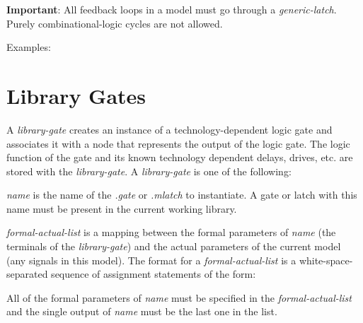 {\begin{pespace}
{\bf Important}: All feedback loops in a model must go through a {\em
generic-latch}.  Purely combinational-logic cycles are not allowed.

Examples:

\section{Library Gates}

A {\em library-gate} creates an instance of a technology-dependent logic gate
and associates it with a node that represents the output of
the logic gate.  The logic function of the
gate and its known technology dependent delays, drives, etc. are stored with
the {\em library-gate}.  A {\em library-gate} is one of the following:


\begin{description}
\item {\em name} is the name of the {\em .gate} or {\em .mlatch} to
instantiate.  A gate or latch with this name must be present in the current
working library.

\item {\em formal-actual-list} is a mapping between the formal parameters of
{\em name} (the terminals of the {\em library-gate}) and the actual
parameters of the current model (any signals in this model).  The format for
a {\em formal-actual-list} is a white-space-separated sequence of assignment
statements of the form:


All of the formal parameters of {\em name} must be specified in the {\em
formal-actual-list} and the single output of {\em name} must be the last one
in the list.


\end{description}
\end{pespace}}
